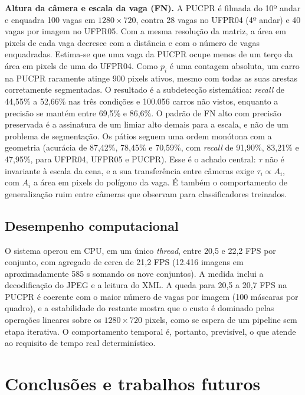 \documentclass[
	article,			%
	11pt,				%
	oneside,			%
	a4paper,			%
	english,			%
	brazil,				%
	sumario=tradicional
	]{abntex2}
\begin{document}
\textbf{Altura da câmera e escala da vaga (FN).} A PUCPR é filmada do 10º andar e enquadra 100 vagas em $1280\times720$, contra 28 vagas no UFPR04 (4º andar) e 40 vagas por imagem no UFPR05. Com a mesma resolução da matriz, a área em pixels de cada vaga decresce com a distância e com o número de vagas enquadradas. Estima-se que uma vaga da PUCPR ocupe menos de um terço da área em pixels de uma do UFPR04. %
Como $p_i$ é uma contagem absoluta, um carro na PUCPR raramente atinge 900 pixels ativos, mesmo com todas as suas arestas corretamente segmentadas. O resultado é a subdetecção sistemática: \textit{recall} de 44,55\% a 52,66\% nas três condições e 100.056 carros não vistos, enquanto a precisão se mantém entre 69,5\% e 86,6\%. O padrão de FN alto com precisão preservada é a assinatura de um limiar alto demais para a escala, e não de um problema de segmentação. Os pátios seguem uma ordem monótona com a geometria (acurácia de 87,42\%, 78,45\% e 70,59\%, com \textit{recall} de 91,90\%, 83,21\% e 47,95\%, para UFPR04, UFPR05 e PUCPR). Esse é o achado central: $\tau$ não é invariante à escala da cena, e a sua transferência entre câmeras exige $\tau_i\propto A_i$, com $A_i$ a área em pixels do polígono da vaga. É também o comportamento de generalização ruim entre câmeras que  observam para classificadores treinados.

\subsection{Desempenho computacional}

O sistema operou em CPU, em um único \textit{thread}, entre 20,5 e 22,2 FPS por conjunto, com agregado de cerca de 21,2 FPS (12.416 imagens em aproximadamente 585 s somando os nove conjuntos). %
A medida inclui a decodificação do JPEG e a leitura do XML. A queda para 20,5 a 20,7 FPS na PUCPR é coerente com o maior número de vagas por imagem (100 máscaras por quadro), e a estabilidade do restante mostra que o custo é dominado pelas operações lineares sobre os $1280\times720$ pixels, como se espera de um pipeline sem etapa iterativa. O comportamento temporal é, portanto, previsível, o que atende ao requisito de tempo real determinístico.

\section{Conclusões e trabalhos futuros}
\end{document}
